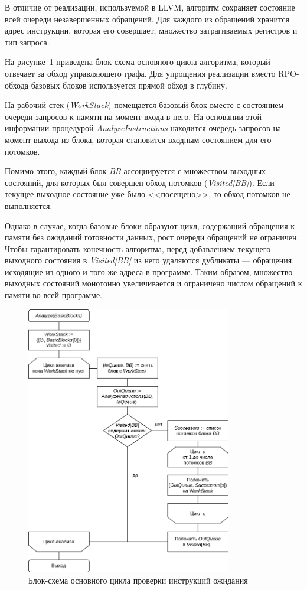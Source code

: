 \documentclass[a4paper,14pt]{extarticle}
\begin{document}
В отличие от реализации, используемой в LLVM, алгоритм сохраняет состояние всей очереди
незавершенных обращений. Для каждого из обращений хранится адрес инструкции, которая его
совершает, множество затрагиваемых регистров и тип запроса.

На рисунке~\ref{fig:diagram-waitcnt} приведена блок-схема основного цикла
алгоритма, который отвечает за обход управляющего графа. Для упрощения реализации
вместо RPO-обхода базовых блоков используется прямой обход в глубину.

На рабочий стек (\textit{WorkStack}) помещается базовый блок вместе с состоянием
очереди запросов к памяти на момент входа в него. На основании этой информации
процедурой \textit{AnalyzeInstructions} находится очередь запросов на момент
выхода из блока, которая становится входным состоянием для его потомков.

Помимо этого, каждый блок \textit{BB} ассоциируется с множеством выходных состояний,
для которых был совершен обход потомков (\textit{Visited[BB]}). Если текущее выходное
состояние уже было <<посещено>>, то обход потомков не выполняется.

Однако в случае, когда базовые блоки образуют цикл, содержащий обращения к памяти без ожиданий
готовности данных, рост очереди обращений не ограничен. Чтобы гарантировать конечность
алгоритма, перед добавлением текущего выходного состояния в \textit{Visited[BB]} из него
удаляются дубликаты — обращения, исходящие из одного и того же адреса в программе. Таким образом,
множество выходных состояний монотонно увеличивается и ограничено числом обращений к памяти
во всей программе.

\begin{figure}[H]
\centering
\includegraphics[width=0.8\textwidth]{diagrams/alg-waitcnt}
\caption{Блок-схема основного цикла проверки инструкций ожидания}
\label{fig:diagram-waitcnt}
\end{figure}
\end{document}
